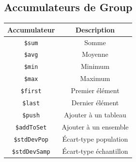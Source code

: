 \documentclass[11pt,a4paper]{article}
\begin{document}
\subsection{Accumulateurs de Group}

\begin{table}[h]
\centering
\begin{tabular}{|c|c|}
\hline
\textbf{Accumulateur} & \textbf{Description} \\
\hline
\texttt{\$sum} & Somme \\
\hline
\texttt{\$avg} & Moyenne \\
\hline
\texttt{\$min} & Minimum \\
\hline
\texttt{\$max} & Maximum \\
\hline
\texttt{\$first} & Premier élément \\
\hline
\texttt{\$last} & Dernier élément \\
\hline
\texttt{\$push} & Ajouter à un tableau \\
\hline
\texttt{\$addToSet} & Ajouter à un ensemble \\
\hline
\texttt{\$stdDevPop} & Écart-type population \\
\hline
\texttt{\$stdDevSamp} & Écart-type échantillon \\
\hline
\end{tabular}
\end{table}
\end{document}
